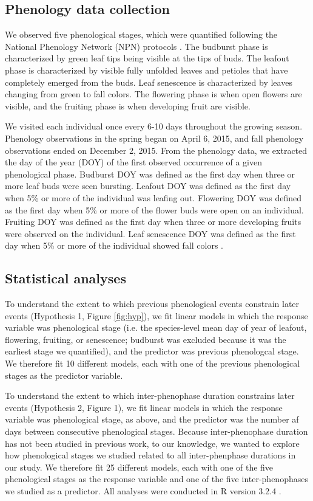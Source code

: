 \documentclass{article}
\begin{document}
\subsection*{Phenology data collection}
We observed five phenological stages, which were quantified following the National Phenology Network (NPN) protocols \citep[for a full description see][]{denny2014}. The budburst phase is characterized by green leaf tips being visible at the tips of buds. The leafout phase is characterized by visible fully unfolded leaves and petioles that have completely emerged from the buds. Leaf senescence is characterized by leaves changing from green to fall colors. The flowering phase is when open flowers are visible, and the fruiting phase is when developing fruit are visible. 
\par We visited each individual once every 6-10 days throughout the growing season. Phenology observations in the spring began on April 6, 2015, and fall phenology observations ended on December 2, 2015.
From the phenology data, we extracted the day of the year (DOY) of the first observed occurrence of a given phenological phase. Budburst DOY was defined as the first day when three or more leaf buds were seen bursting. Leafout DOY was defined as the first day when 5\% or more of the individual was leafing out. Flowering DOY was defined as the first day when 5\% or more of the flower buds were open on an individual. Fruiting DOY was defined as the first day when three or more developing fruits were observed on the individual. Leaf senescence DOY was defined as the first day when 5\% or more of the individual showed fall colors \citep{denny2014}.
\subsection*{Statistical analyses}
To understand the extent to which previous phenological events constrain later events (Hypothesis 1, Figure \ref{fig:hyp}), we fit linear models in which the response variable was phenological stage (i.e. the species-level mean day of year of leafout, flowering, fruiting, or senescence; budburst was excluded because it was the earliest stage we quantified), and the predictor was previous phenologcal stage.  We therefore fit 10 different models, each with one of the previous phenological stages as the predictor variable. 
\par To understand the extent to which inter-phenophase duration constrains later events (Hypothesis 2, Figure 1), we fit linear models in which the response variable was phenological stage, as above, and the predictor was the number af days between consecutive phenological stages. Because inter-phenophase duration has not been studied in previous work, to our knowledge, we wanted to explore how phenological stages we studied related to all inter-phenphase durations in our study. We therefore fit 25 different models, each with one of the five phenological stages as the response variable and one of the five inter-phenophases we studied as a predictor.
All analyses were conducted in R version 3.2.4 \citep{rcoreteam2016}.
\end{document}

